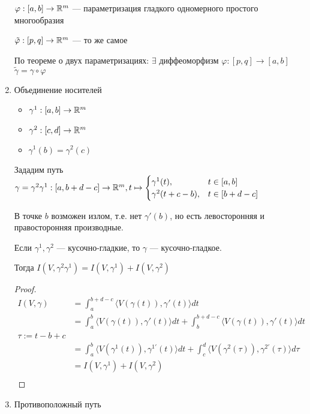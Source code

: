 \begin{enumerate}
	      \begin{remark}
		      $\varphi : [a, b] \to\mathbb{R}^m$ --- параметризация гладкого одномерного простого многообразия

		      $\tilde \varphi : [p, q] \to\mathbb{R}^m$ --- то же самое

		      По теореме о двух параметризациях: $\exists$ диффеоморфизм $\varphi : [p, q] \to [a, b]$ $\tilde \gamma = \gamma \circ \varphi$
	      \end{remark}
	\item Объединение носителей
	      \begin{itemize}
		      \item $\gamma^1 : [a, b]\to\mathbb{R}^m$
		      \item $\gamma^2 : [c, d]\to\mathbb{R}^m$
		      \item $\gamma^1(b) = \gamma^2(c)$
	      \end{itemize}

	      Зададим путь $\gamma = \gamma^2 \gamma^1 : [a, b + d - c] \to\mathbb{R}^m, t\mapsto \begin{cases}
			      \gamma^1(t) ,         & t\in [a, b]      \\
			      \gamma^2(t + c - b) , & t\in [b + d - c]
		      \end{cases}$

	      В точке $b$ возможен излом, т.е. нет $\gamma'(b)$, но есть левосторонняя и правосторонняя производные.

	      Если $\gamma^1, \gamma^2$ --- кусочно-гладкие, то $\gamma$ --- кусочно-гладкое.

	      Тогда $I(V, \gamma^2\gamma^1) = I(V, \gamma^1) + I(V, \gamma^2)$

	      \begin{proof}
		      \begin{align*}
			      I(V, \gamma) & = \int_a^{b+d-c} \langle V(\gamma(t)), \gamma'(t)\rangle dt                                                                                  \\
			                   & = \int_a^b \langle V(\gamma(t)), \gamma'(t)\rangle dt + \int_b^{b+d-c} \langle V(\gamma(t)), \gamma'(t)\rangle dt                            \\
			      \tau := t - b + c                                                                                                                                           \\
			                   & = \int_a^b \langle V(\gamma^1(t)), \gamma^{1\prime}(t)\rangle dt + \int_c^{d} \langle V(\gamma^2(\tau)), \gamma^{2\prime}(\tau)\rangle d\tau \\
			                   & = I(V, \gamma^1) + I(V, \gamma^2)                                                                                                            \\
		      \end{align*}
	      \end{proof}
	\item Противоположный путь


\end{enumerate}
